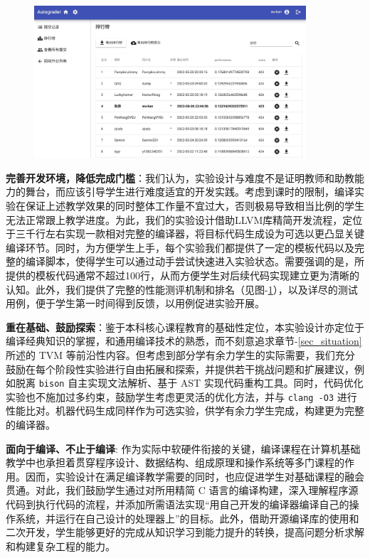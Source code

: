 \documentclass{SCIS2020cn}
\begin{document}
\begin{figure}
    \centering
    \includegraphics[width=0.9\textwidth]{assets/image/rank.jpg}
    \label{rank}
\end{figure}

\textbf{完善开发环境，降低完成门槛}：我们认为，实验设计与难度不是证明教师和助教能力的舞台，而应该引导学生进行难度适宜的开发实践。考虑到课时的限制，编译实验在保证上述教学效果的同时整体工作量不宜过大，否则极易导致相当比例的学生无法正常跟上教学进度。为此，我们的实验设计借助LLVM库精简开发流程，定位于三千行左右实现一款相对完整的编译器，将目标代码生成设为可选以更凸显关键编译环节。同时，为方便学生上手，每个实验我们都提供了一定的模板代码以及完整的编译脚本，使得学生可以通过动手尝试快速进入实验状态。需要强调的是，所提供的模板代码通常不超过100行，从而方便学生对后续代码实现建立更为清晰的认知。此外，我们提供了完整的性能测评机制和排名（见图-\ref{rank}），以及详尽的测试用例，便于学生第一时间得到反馈，以用例促进实验开展。

\textbf{重在基础、鼓励探索}：鉴于本科核心课程教育的基础性定位，本实验设计亦定位于编译经典知识的掌握，和通用编译技术的熟悉，而不刻意追求章节-\ref{sec_situation} 所述的 TVM 等前沿性内容。但考虑到部分学有余力学生的实际需要，我们充分鼓励在每个阶段性实验进行自由拓展和探索，并提供若干挑战问题和扩展建议，例如脱离 \texttt{bison} 自主实现文法解析、基于 AST 实现代码重构工具。同时，代码优化实验也不施加过多约束，鼓励学生考虑更灵活的优化方法，并与 {\tt clang -O3} 进行性能比对。机器代码生成同样作为可选实验，供学有余力学生完成，构建更为完整的编译器。

\textbf{面向于编译、不止于编译}: 作为实际中软硬件衔接的关键，编译课程在计算机基础教学中也承担着贯穿程序设计、数据结构、组成原理和操作系统等多门课程的作用。因而，实验设计在满足编译教学需要的同时，也应促进学生对基础课程的融会贯通。对此，我们鼓励学生通过对所用精简 C 语言的编译构建，深入理解程序源代码到执行代码的流程，并添加所需语法实现“用自己开发的编译器编译自己的操作系统，并运行在自己设计的处理器上”的目标。此外，借助开源编译库的使用和二次开发，学生能够更好的完成从知识学习到能力提升的转换，提高问题分析求解和构建复杂工程的能力。
\end{document}
